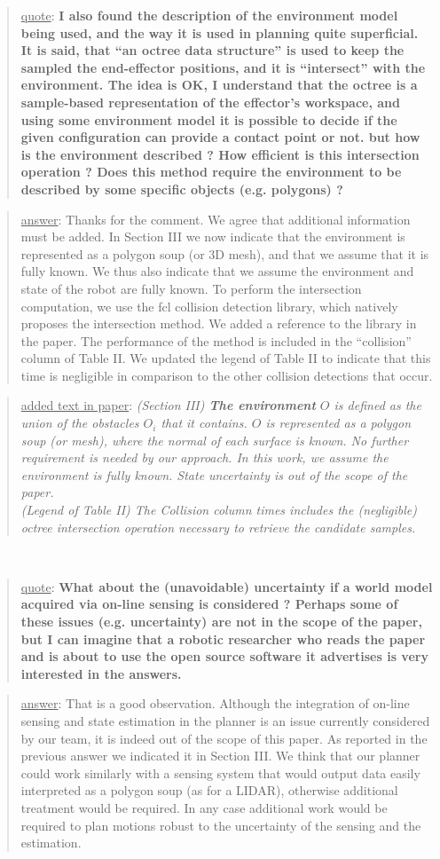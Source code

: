 \documentclass[a4paper]{article}
\newcommand{\done}[0]{}
\newcommand\quot[1]{\begin{quote} \underline{quote}: \textbf{#1}\end{quote}}
\newcommand\as[1]{\begin{quote} \underline{answer}: {#1}\end{quote} }
\newcommand\qt[1]{\begin{quote} \underline{added text in paper}: \textit{#1}\end{quote} \leavevmode \\ }
\begin{document}
\quot{ I also found the description of the environment model being
used,
and the way it is used in planning quite superficial. It is said, that
``an octree data structure'' is used to keep the sampled the
end-effector positions, and it is ``intersect'' with the environment.
The idea is OK, I understand that the octree is a sample-based
representation of the effector's workspace, and using some environment
model it is possible to decide if the given configuration can provide a
contact point or not. but how is the environment described ? How
efficient is this intersection operation ? Does this method require the
environment to be described by some specific objects (e.g. polygons) ?
}

\as{Thanks for the comment. We agree that additional information must be added. In Section III we now indicate that the environment is represented as a polygon soup (or 3D mesh), and
that we assume that it is fully known.  We thus also indicate that we assume the environment and state of the robot are fully known. To perform the intersection computation, we use
the fcl collision detection library, which natively proposes the intersection method. We added a reference to the library in the paper. The performance of the method is included
in the ``collision'' column of Table II. We updated the legend of Table II to indicate that this time is negligible in comparison to the other collision detections that occur.
} 
\qt{(Section III) \textbf{The environment} $O$ is defined as the union of the obstacles $O_i$ that it contains. $O$ is represented
as a polygon soup (or mesh), where the normal of each surface is known. No further requirement is needed
by our approach. In this work, we assume the environment is fully known. State uncertainty is out of the scope of the paper. \\
(Legend of Table II)  The Collision column times includes the (negligible) octree intersection operation necessary to retrieve the candidate samples.}
\done

\quot{What about the (unavoidable) uncertainty if a world model acquired via
on-line sensing is considered ? Perhaps some of these issues (e.g.
uncertainty) are not in the scope of the paper, but I can imagine that
a robotic researcher who reads the paper and is about to use the open
source software it advertises is very interested in the answers.}
\as{That is a good observation. Although the integration of on-line sensing and state estimation in the planner is an issue currently considered by our team, it is indeed
out of the scope of this paper. As reported in the previous answer we indicated it in Section III. We think that our planner could work similarly with 
a sensing system that would output data easily interpreted as a polygon soup (as for a LIDAR), otherwise additional treatment would be required. In any case additional work would be required to plan motions robust to the uncertainty of the sensing and the estimation. } \done
\end{document}
